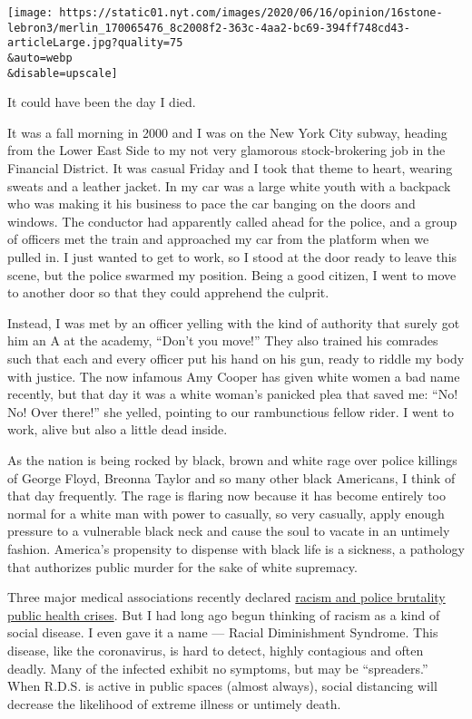 \texttt{[image: https://static01.nyt.com/images/2020/06/16/opinion/16stone-lebron3/merlin\_170065476\_8c2008f2-363c-4aa2-bc69-394ff748cd43-articleLarge.jpg?quality=75\\\&auto=webp\\\&disable=upscale]}

It could have been the day I died.

It was a fall morning in 2000 and I was on the New York City subway,
heading from the Lower East Side to my not very glamorous
stock-brokering job in the Financial District. It was casual Friday and
I took that theme to heart, wearing sweats and a leather jacket. In my
car was a large white youth with a backpack who was making it his
business to pace the car banging on the doors and windows. The conductor
had apparently called ahead for the police, and a group of officers met
the train and approached my car from the platform when we pulled in. I
just wanted to get to work, so I stood at the door ready to leave this
scene, but the police swarmed my position. Being a good citizen, I went
to move to another door so that they could apprehend the culprit.

Instead, I was met by an officer yelling with the kind of authority that
surely got him an A at the academy, ``Don't you move!'' They also
trained his comrades such that each and every officer put his hand on
his gun, ready to riddle my body with justice. The now infamous Amy
Cooper has given white women a bad name recently, but that day it was a
white woman's panicked plea that saved me: ``No! No! Over there!'' she
yelled, pointing to our rambunctious fellow rider. I went to work, alive
but also a little dead inside.

As the nation is being rocked by black, brown and white rage over police
killings of George Floyd, Breonna Taylor and so many other black
Americans, I think of that day frequently. The rage is flaring now
because it has become entirely too normal for a white man with power to
casually, so very casually, apply enough pressure to a vulnerable black
neck and cause the soul to vacate in an untimely fashion. America's
propensity to dispense with black life is a sickness, a pathology that
authorizes public murder for the sake of white supremacy.

Three major medical associations recently declared
\href{https://www.cnn.com/2020/06/01/health/racism-public-health-issue-police-brutality-wellness-bn/index.html}{racism
and police brutality public health crises}. But I had long ago begun
thinking of racism as a kind of social disease. I even gave it a name
--- Racial Diminishment Syndrome. This disease, like the coronavirus, is
hard to detect, highly contagious and often deadly. Many of the infected
exhibit no symptoms, but may be ``spreaders.'' When R.D.S. is active in
public spaces (almost always), social distancing will decrease the
likelihood of extreme illness or untimely death.

